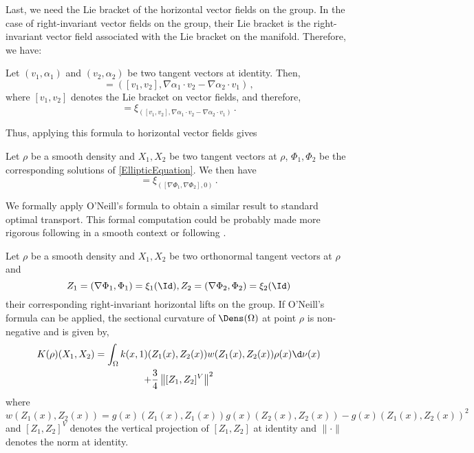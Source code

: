 Last, we need the Lie bracket of the horizontal vector fields on the group. In the case of right-invariant vector fields on the group, their Lie bracket is the right-invariant vector field associated with the Lie bracket on the manifold. Therefore, we have:
\begin{proposition}
Let $(v_1,\alpha_1)$ and $(v_2,\alpha_2)$ be two tangent vectors at identity. Then,
 \begin{equation}
[(v_1,\alpha_1),(v_2,\alpha_2)] = \left( [v_1,v_2] , \nabla \alpha_1\cdot v_2 - \nabla \alpha_2\cdot v_1 \right)\,,
\end{equation}
where $ [v_1,v_2]$ denotes the Lie bracket on vector fields, and therefore,
 \begin{equation}
[\xi_{(v_1,\alpha_1)},\xi_{(v_2,\alpha_2)}] = \xi_{\left( [v_1,v_2] , \nabla \alpha_1\cdot v_2 - \nabla \alpha_2\cdot v_1 \right)}\,.
\end{equation}

 \end{proposition}
Thus, applying this formula to horizontal vector fields gives
\begin{corollary}
Let $\rho$ be a smooth density and $X_1, X_2$ be two tangent vectors at $\rho$, $\Phi_1,\Phi_2$ be the corresponding solutions of \eqref{EllipticEquation}. We then have
 \begin{equation}
[\xi_{(\nabla \Phi_1,\Phi_1)},\xi_{(\nabla \Phi_2,\Phi_2)}] = \xi_{\left( [\nabla \Phi_1,\nabla \Phi_2] ,0 \right)}\,.
\end{equation} 
\end{corollary}

We formally apply O'Neill's formula to obtain a similar result to standard optimal transport. This formal computation could be probably made more rigorous following \cite{lott2008some} in a smooth context or following \cite{UserGuideOT}.

\begin{proposition}\label{prop-curvature}
Let $\rho$ be a smooth density and $X_1, X_2$ be two orthonormal tangent vectors at $\rho$ and $$Z_1= (\nabla \Phi_1,\Phi_1)=\xi_{1}(\Id), Z_2= (\nabla \Phi_2,\Phi_2)=\xi_{2}(\Id)$$ their corresponding right-invariant horizontal lifts on the group.
If O'Neill's formula can be applied, the sectional curvature of $\Dens(\Omega)$ at point $\rho$ is non-negative and is given by, 
\begin{multline}\label{SectionalCurvatureONeill}
K(\rho)(X_1,X_2) = \int_\Omega k(x,1)(Z_1(x),Z_2(x)) w(Z_1(x),Z_2(x)) \rho(x) \d \nu(x) \\ + \frac 34 \left\| [Z_1,Z_2]^V \right\|^2
\end{multline}
where  
$$w(Z_1(x),Z_2(x)) = g(x)(Z_1(x),Z_1(x))g(x)(Z_2(x),Z_2(x))-g(x)(Z_1(x),Z_2(x))^2$$ and $ [Z_1,Z_2]^V$ denotes the vertical projection of $[Z_1,Z_2]$ at identity and $\| \cdot \|$ denotes the norm at identity.
\end{proposition}

